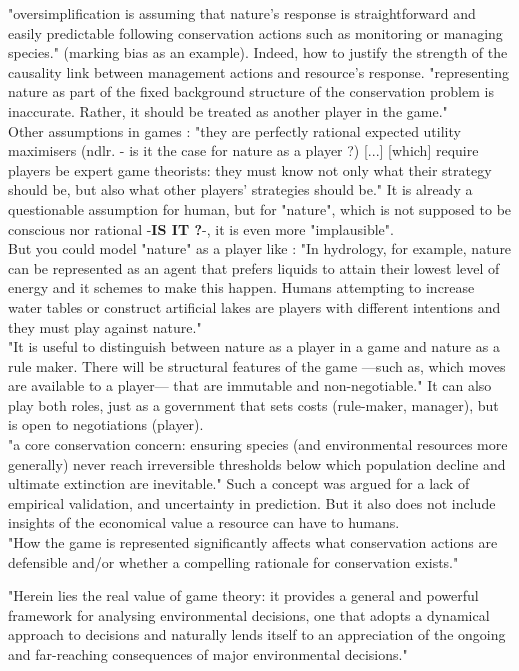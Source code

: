 \documentclass[12pt]{article}
\begin{document}
"oversimplification is assuming that nature’s response is straightforward and easily predictable following conservation actions such as monitoring or managing species." (marking bias as an example). Indeed, how to justify the strength of the causality link between management actions and resource's response.
"representing nature as part of the fixed background structure of the
conservation problem is inaccurate. Rather, it should be treated
as another player in the game."\\
Other assumptions in games : "they are perfectly rational
expected utility maximisers (ndlr. - is it the case for nature as a player ?) [...] [which] require players be expert game theorists: they must know
not only what their strategy should be, but also what other players’
strategies should be." It is already a questionable assumption for human, but for "nature", which is not supposed to be conscious nor rational -\textbf{IS IT ?}-, it is even more "implausible".\\
But you could model "nature" as a player like : "In hydrology, for example, nature
can be represented as an agent that prefers liquids to attain their
lowest level of energy and it schemes to make this happen. Humans attempting to increase water tables or construct artificial lakes are players
with different intentions and they must play against nature."\\
"It is useful to distinguish between nature as a player in a game
and nature as a rule maker. There will be structural features of the
game —such as, which moves are available to a player— that are
immutable and non-negotiable." It can also play both roles, just as a government that sets costs (rule-maker, manager), but is open to negotiations (player).\\
"a core conservation
concern: ensuring species (and environmental resources more generally) never reach irreversible thresholds below which population
decline and ultimate extinction are inevitable." Such a concept was argued for a lack of empirical validation, and uncertainty in prediction. But it also does not include insights of the economical value a resource can have to humans.\\

"How the game is represented significantly affects what conservation actions are defensible and/or whether a compelling rationale for conservation exists."

"Herein lies
the real value of game theory: it provides a general and powerful
framework for analysing environmental decisions, one that
adopts a dynamical approach to decisions and naturally lends itself to an appreciation of the ongoing and far-reaching consequences of major environmental decisions."
\end{document}
